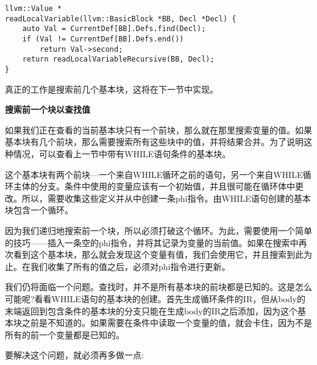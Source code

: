 \begin{lstlisting}[caption={}]
llvm::Value *
readLocalVariable(llvm::BasicBlock *BB, Decl *Decl) {
	auto Val = CurrentDef[BB].Defs.find(Decl);
	if (Val != CurrentDef[BB].Defs.end())
		return Val->second;
	return readLocalVariableRecursive(BB, Decl);
}
\end{lstlisting}

真正的工作是搜索前几个基本块，这将在下一节中实现。\par

\hspace*{\fill} \par %
\textbf{搜索前一个块以查找值}

如果我们正在查看的当前基本块只有一个前块，那么就在那里搜索变量的值。如果基本块有几个前块，那么需要搜索所有这些块中的值，并将结果合并。为了说明这种情况，可以查看上一节中带有WHILE语句条件的基本块。\par

这个基本块有两个前块—一个来自WHILE循环之前的语句，另一个来自WHILE循环主体的分支。条件中使用的变量应该有一个初始值，并且很可能在循环体中更改。所以，需要收集这些定义并从中创建一条phi指令。由WHILE语句创建的基本块包含一个循环。\par

因为我们递归地搜索前一个块，所以必须打破这个循环。为此，需要使用一个简单的技巧——插入一条空的phi指令，并将其记录为变量的当前值。如果在搜索中再次看到这个基本块，那么就会发现这个变量有值，我们会使用它，并且搜索到此为止。在我们收集了所有的值之后，必须对phi指令进行更新。\par

我们仍将面临一个问题。查找时，并不是所有基本块的前块都是已知的。这是怎么可能呢?看看WHILE语句的基本块的创建。首先生成循环条件的IR，但从body的末端返回到包含条件的基本块的分支只能在生成body的IR之后添加，因为这个基本块之前是不知道的。如果需要在条件中读取一个变量的值，就会卡住，因为不是所有的前一个变量都是已知的。\par

要解决这个问题，就必须再多做一点:\par

